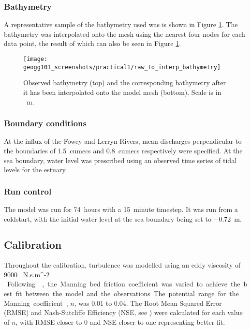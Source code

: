 \documentclass{article}
\begin{document}
\subsubsection{Bathymetry}
A representative sample of the bathymetry used was is shown in Figure \ref{fig:raw_to_interp_bathymetry}. The bathymetry was interpolated onto the mesh using the nearest four nodes for each data point, the result of which can also be seen in Figure \ref{fig:raw_to_interp_bathymetry}.

\begin{figure}[hbp]
    \centering
    \texttt{[image: geogg101\_screenshots/practical1/raw\_to\_interp\_bathymetry]}
    \caption{Observed bathymetry (top) and the corresponding bathymetry after it has been interpolated onto the model mesh (bottom). Scale is in \SI{}{m}.}
    \label{fig:raw_to_interp_bathymetry}
\end{figure}

\subsubsection{Boundary conditions}
At the influx of the Fowey and Lerryn Rivers, mean discharges perpendicular to the boundaries of \SI{1.5}{cumecs} and \SI{0.8}{cumecs} respectively were specified. At the sea boundary, water level was prescribed using an observed time series of tidal levels for the estuary.

\subsubsection{Run control}
The model was run for \SI{74}{hours} with a \SI{15}{minute} timestep. It was run from a coldstart, with the initial water level at the sea boundary being set to \SI{-0.72}{m}. 

\subsection{Calibration}

Throughout the calibration, turbulence was modelled using an eddy viscosity of \SI{9000}{ N.s.m^{-2} }.
Following \textcite{piedra2007residual, sousa2007hydrodynamic}, the  Manning bed friction coefficient was varied to achieve the best fit between the model and the observations. The potential range for the Manning coefficient, $n$, was 0.01 to 0.04. The Root Mean Squared Error (RMSE) and Nash-Sutcliffe Efficiency (NSE, see \textcite{nash1970river}) were calculated for each value of $n$, with RMSE closer to 0 and NSE closer to one representing better fit.
\end{document}
